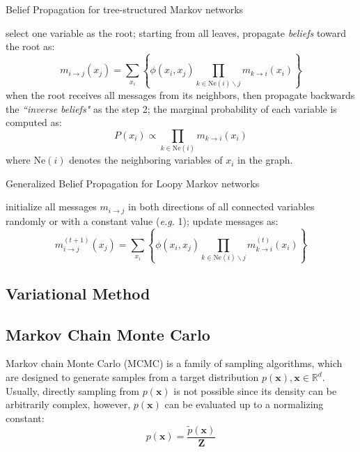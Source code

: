 \begin{algorithm}
	\caption{Belief Propagation for tree-structured Markov networks}
	\label{alg:BP_tree}
\begin{algorithmic}[1]
\STATE  select one variable as the root; 
\STATE  starting from all leaves, propagate \emph{beliefs} toward the root as:
\begin{equation*}
m_{i \rightarrow j}(x_j)= \sum_{x_i}\left\{\phi(x_i,x_j) \prod_{k\in \text{Ne}(i)\backslash j} m_{k \rightarrow i}(x_i)\right\}
\end{equation*}
\STATE  when the root receives all messages from its neighbors, then propagate backwards the \emph{``inverse beliefs"} as the step 2;
\STATE  the marginal probability of each variable is computed as: 
\begin{equation*}
P(x_i)\propto \prod_{k\in \text{Ne}(i)} m_{k \rightarrow i}(x_i)
\end{equation*}
where Ne$(i)$ denotes the neighboring variables of $x_i$ in the graph. 
\end{algorithmic}
\end{algorithm}



\begin{algorithm}
	\caption{Generalized Belief Propagation for Loopy Markov networks}
	\label{alg:LBP}
\begin{algorithmic}[1]
\STATE  initialize all messages $m_{i\rightarrow j}$ in both directions of all connected variables randomly or with a constant value (\emph{e.g.} 1);
\STATE  update messages as:
\begin{equation*}
  m^{(t+1)}_{i \rightarrow j}(x_j)= \sum_{x_i}\left\{\phi(x_i,x_j) \prod_{k\in \text{Ne}(i)\backslash j} m^{(t)}_{k \rightarrow i}(x_i)\right\}
\end{equation*}
\ENDWHILE
\end{algorithmic}
\end{algorithm}


\subsection{Variational Method}


\subsection{Markov Chain Monte Carlo}
Markov chain Monte Carlo (MCMC) is a family of sampling algorithms, which are designed to generate samples from a target distribution $p(\mathbf{x}), \mathbf{x}\in\mathbb{R}^d$. 
Usually, directly sampling from $p(\mathbf{x})$ is not possible since its density can be arbitrarily complex, however, $p(\mathbf{x})$ can be evaluated up to a normalizing constant:
\begin{equation*}
	p(\mathbf{x})=\frac{\tilde{p}(\mathbf{x})}{\mathbf{Z}}
\end{equation*}

